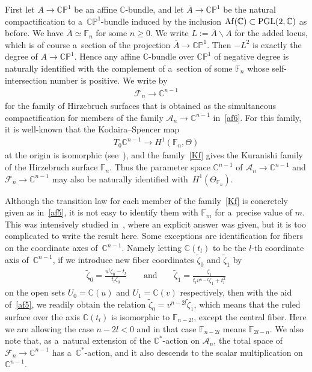 \documentclass[pdftex]{sigma}
\numberwithin{equation}{section}
\begin{document}
First let $A\to \mathbb{CP}^1$ be an af\/f\/ine $\mathbb{C}$-bundle, and let $\overline A\to \mathbb{CP}^1$ be the
natural compactif\/ication to a~$\mathbb{CP}^1$-bundle induced by the inclusion ${\rm Af}(\mathbb{C})\subset
\mathrm{PGL}(2,\mathbb{C})$ as before.
We have $\overline A\simeq \mathbb{F}_n$ for some $n\ge 0$.
We write $L:= \overline A\backslash A$ for the added locus, which is of course a~section of the projection $\overline A\to \mathbb{CP}^1$.
Then $-L^2$ is exactly the degree of $A\to \mathbb{CP}^1$.
Hence any af\/f\/ine $\mathbb{C}$-bundle over $\mathbb{CP}^1$ of negative degree is naturally identif\/ied with the
complement of a~section of some $\mathbb{F}_n$ whose self-intersection number is positive.
We write by
\begin{gather}
\label{Kf}
\mathscr F_n\to \mathbb{C}^{n-1}
\end{gather}
for the family of Hirzebruch surfaces that is obtained as the simultaneous compactif\/ication for members of the family
$\mathscr A_n\to \mathbb{C}^{n-1}$ in~\eqref{af6}.
For this family, it is well-known that the Kodaira--Spencer map
\begin{gather}
\label{ks001}
T_0\mathbb{C}^{n-1}\to H^1(\mathbb{F}_n,\Theta)
\end{gather}
at the origin is isomorphic (see~\cite[pp.~309--312]{K}), and the family~\eqref{Kf} gives the Kuranishi family of the
Hirzebruch surface $\mathbb{F}_n$.
Thus the parameter space $\mathbb{C}^{n-1}$ of $\mathscr A_n\to\mathbb{C}^{n-1}$ and $\mathscr F_n\to\mathbb{C}^{n-1}$
may also be naturally identif\/ied with~$H^1(\Theta_{\mathbb{F}_n})$.

Although the transition law for each member of the family~\eqref{Kf} is concretely given as in~\eqref{af5}, it is not
easy to identify them with $\mathbb{F}_m$ for a~precise value of $m$.
This was intensively studied in~\cite[p.~143, Theorem]{Suwa}, where an explicit answer was given, but it is too
complicated to write the result here.
Some exceptions are identif\/ication for f\/ibers on the coordinate axes of~$\mathbb{C}^{n-1}$.
Namely letting $\mathbb{C}(t_l)$ to be the $l$-th coordinate axis of~$\mathbb{C}^{n-1}$, if we introduce new f\/iber
coordinates $\tilde{\zeta}_0$ and $\tilde{\zeta}_1$ by
\begin{gather}
\label{zeta'}
\tilde{\zeta}_0 = \frac{u^l\zeta_0-t_l}{t_l\zeta_0}
\qquad
\text{and}
\qquad
\tilde{\zeta}_1= \frac{\zeta_1}{t_lv^{n-l}\zeta_1 + t_l^2}
\end{gather}
on the open sets $U_0=\mathbb{C}(u)$ and $U_1=\mathbb{C}(v)$ respectively, then with the aid of~\eqref{af5}, we readily
obtain the relation $\tilde{\zeta}_0 = v^{n-2l}\tilde{\zeta}_1$, which means that the ruled surface over the axis
$\mathbb{C}(t_l)$ is isomorphic to $\mathbb{F}_{n-2l}$, except the central f\/iber.
Here we are allowing the case $n-2l<0$ and in that case $\mathbb{F}_{n-2l}$ means $\mathbb{F}_{2l-n}$.
We also note that, as a~natural extension of the $\mathbb{C}^*$-action on $\mathscr A_n$, the total space of $\mathscr
F_n\to\mathbb{C}^{n-1}$ has a~$\mathbb{C}^*$-action, and it also descends to the scalar multiplication on $\mathbb{C}^{n-1}$.
\end{document}
